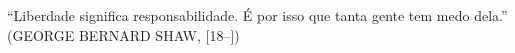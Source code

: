 \begin{epigrafe}
    \vspace*{\fill}
{%
	\noindent\hspace{.5\textwidth}
	{\begin{minipage}{.5\textwidth}
		\begin{flushright}
			``Liberdade significa responsabilidade. É por isso que tanta gente tem medo dela.'' (GEORGE BERNARD SHAW, [18--])
		\end{flushright}
	\end{minipage}}%
	\vspace*{3cm}
}%
\end{epigrafe}
